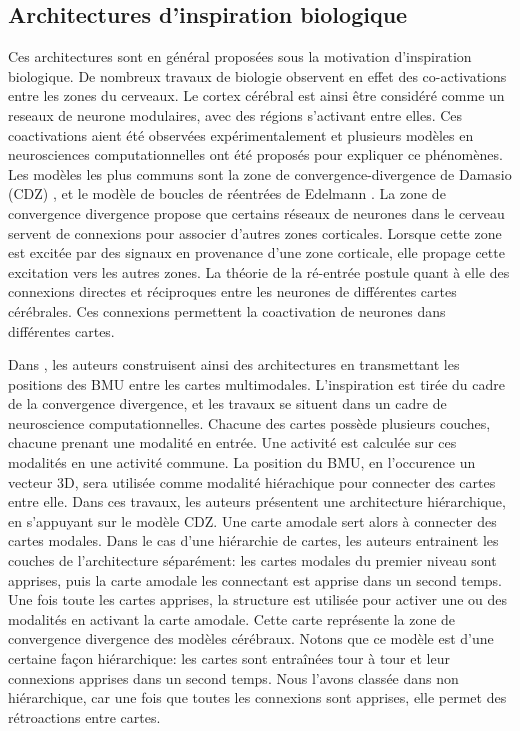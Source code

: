 \documentclass[../main]{subfiles}
\begin{document}
\subsection{Architectures d'inspiration biologique}
Ces architectures sont en général proposées sous la motivation d'inspiration biologique.
De nombreux travaux de biologie observent en effet des co-activations entre les zones du cerveaux. Le cortex cérébral est ainsi être considéré comme un reseaux de neurone modulaires, avec des régions s'activant entre elles. \cite{primate_cortex_91,mountcastle_columnar_1997,Harriger2012RichCO}
Ces coactivations aient été observées expérimentalement et plusieurs modèles en neurosciences computationnelles ont été proposés pour expliquer ce phénomènes. Les modèles les plus communs sont la zone de convergence-divergence de Damasio (CDZ) \cite{damasio_time-locked_1989}, et le modèle de boucles de réentrées de Edelmann \cite{Edelman1982GroupSA}.
La zone de convergence divergence propose que certains réseaux de neurones dans le cerveau servent de connexions pour associer d'autres zones corticales. Lorsque cette zone est excitée par des signaux en provenance d'une zone corticale, elle propage cette excitation vers les autres zones.
La théorie de la ré-entrée postule quant à elle des connexions directes et réciproques entre  les neurones de différentes cartes cérébrales. Ces connexions permettent la coactivation de neurones dans différentes cartes. 


Dans \cite{dominey13}, les auteurs construisent ainsi des architectures en transmettant les positions des BMU entre les cartes multimodales. L'inspiration est tirée du cadre de la convergence divergence, et les travaux se situent dans un cadre de neuroscience computationnelles.
Chacune des cartes possède plusieurs couches, chacune prenant une modalité en entrée. Une activité est calculée sur ces modalités en une activité commune. La position du BMU, en l'occurence un vecteur 3D, sera utilisée comme modalité hiérachique pour connecter des cartes entre elle. Dans ces travaux, les auteurs présentent une architecture hiérarchique, en s'appuyant sur le modèle CDZ. Une carte amodale sert alors à connecter des cartes modales.
Dans le cas d'une hiérarchie de cartes, les auteurs entrainent les couches de l'architecture séparément: les cartes modales du premier niveau sont apprises, puis la carte amodale les connectant est apprise dans un second temps. 
Une fois toute les cartes apprises, la structure est utilisée pour activer une ou des modalités en activant la carte amodale. Cette carte représente la zone de convergence divergence des modèles cérébraux. 
Notons que ce modèle est d'une certaine façon hiérarchique: les cartes sont entraînées tour à tour et leur connexions apprises dans un second temps. Nous l'avons classée dans non hiérarchique, car une fois que toutes les connexions sont apprises, elle permet des rétroactions entre cartes.
\end{document}
